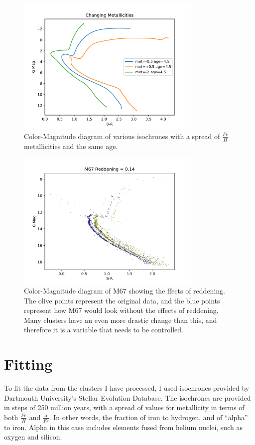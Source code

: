 \documentclass[aps,prb,twocolumn,groupedaddress,nofootinbib,floatfix]{revtex4-1}
\begin{document}
\begin{figure}[!h]
	\centering
      \includegraphics[width=3.5in]{iso_sample_metallicity.pdf}
	\caption{Color-Magnitude diagram of various isochrones with a spread of $\frac{Fe}{H}$ metallicities and the same age.}
	\label{fig:Isochrone_Sample_Metallicity}
\end{figure}

\begin{figure}[!h]
	\centering
      \includegraphics[width=3.5in]{reddening.pdf}
	\caption{Color-Magnitude diagram of M67 showing the ffects of reddening. The olive points represent the original data, and the blue points represent how M67 would look without the effects of reddening. Many clusters have an even more drastic change than this, and therefore it is a variable that needs to be controlled.}
	\label{fig:reddening}
\end{figure}

\section*{Fitting}
To fit the data from the clusters I have processed, I used isochrones provided by Dartmouth University's Stellar Evolution Database. The isochrones are provided in steps of 250 million years, with a spread of values for metallicity in terms of both $\frac{Fe}{H}$ and $\frac{\alpha}{Fe}$. In other words, the fraction of iron to hydrogen, and of ``alpha'' to iron. Alpha in this case includes elements fused from helium nuclei, such as oxygen and silicon.
\end{document}
